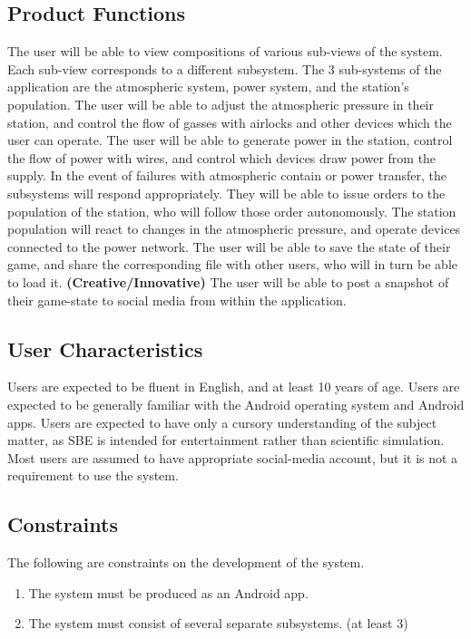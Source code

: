 \documentclass[]{article}
\begin{document}
\subsection{Product Functions}
\label{sub:product_functions}
The user will be able to view compositions of various sub-views of the system. Each sub-view corresponds to a different subsystem. The 3 sub-systems of the application are the atmospheric system, power system, and the station's population. The user will be able to adjust the atmospheric pressure in their station, and control the flow of gasses with airlocks and other devices which the user can operate. The user will be able to generate power in the station, control the flow of power with wires, and control which devices draw power from the supply. In the event of failures with atmospheric contain or power transfer, the subsystems will respond appropriately. They will be able to issue orders to the population of the station, who will follow those order autonomously. The station population will react to changes in the atmospheric pressure, and operate devices connected to the power network. The user will be able to save the state of their game, and share the corresponding file with other users, who will in turn be able to load it. \textbf{(Creative/Innovative)} The user will be able to post a snapshot of their game-state to social media from within the application.


\subsection{User Characteristics}
\label{sub:user_characteristics}
	Users are expected to be fluent in English, and at least 10 years of age. Users are expected to be generally familiar with the Android operating system and Android apps. Users are expected to have only a cursory understanding of the subject matter, as SBE is intended for entertainment rather than scientific simulation. Most users are assumed to have appropriate social-media account, but it is not a requirement to use the system.

\subsection{Constraints}
\label{sub:constraints}
	The following are constraints on the development of the system.
	\begin{enumerate}
		\item The system must be produced as an Android app.
		\item The system must consist of several separate subsystems. (at least 3)
	\end{enumerate}
\end{document}
